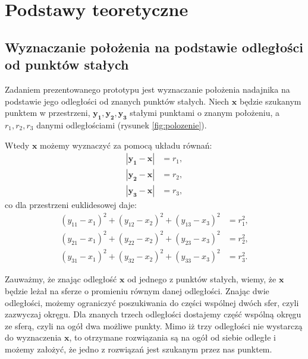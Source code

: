 \chapter{Podstawy teoretyczne}
\section{Wyznaczanie położenia na podstawie odległości od punktów stałych}

Zadaniem prezentowanego prototypu jest wyznaczanie położenia nadajnika na podstawie jego 
odległości od znanych punktów stałych. Niech $\boldsymbol{x}$ będzie szukanym punktem w przestrzeni,
$\boldsymbol{y_1,y_2,y_3}$ stałymi punktami o znanym położeniu, a $r_1,r_2,r_3$ danymi odległościami
(rysunek \ref{fig:polozenie}).

Wtedy $\boldsymbol{x}$ możemy wyznaczyć za pomocą układu równań:
 \begin{align}
    \nonumber |\boldsymbol{y_1} - \boldsymbol{x}| &= r_1,
 \\ \nonumber |\boldsymbol{y_2} - \boldsymbol{x}| &= r_2,
 \\ \nonumber |\boldsymbol{y_3} - \boldsymbol{x}| &= r_3,
 \end{align}
co dla przestrzeni euklidesowej daje:
 \begin{align}  
    \nonumber   (y_{11}-x_1)^2 + (y_{12}-x_2)^2 + (y_{13}-x_3)^2 &= r_1^2,
 \\ \nonumber   (y_{21}-x_1)^2 + (y_{22}-x_2)^2 + (y_{23}-x_3)^2 &= r_2^2,
 \\ \nonumber   (y_{31}-x_1)^2 + (y_{32}-x_2)^2 + (y_{33}-x_3)^2 &= r_3^2.
 \end{align}

Zauważmy, że znając odległość $\boldsymbol{x}$ od jednego z punktów stałych, wiemy, że $\boldsymbol{x}$ będzie leżał na
sferze o promieniu równym danej odległości. Znając dwie odległości, możemy ograniczyć poszukiwania do części wspólnej dwóch sfer,
czyli zazwyczaj okręgu. Dla znanych trzech odległości dostajemy część wspólną okręgu ze sferą, czyli na ogół dwa możliwe punkty.
Mimo iż trzy odległości nie wystarczą do wyznaczenia $\boldsymbol{x}$, 
to otrzymane rozwiązania są na ogół od siebie odległe i 
możemy założyć, że jedno z rozwiązań jest szukanym przez nas punktem.

